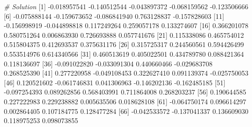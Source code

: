 \documentclass[
]{article}
\newenvironment{Shaded}{\begin{snugshade}}{\end{snugshade}}
\newcommand{\CommentTok}[1]{\textcolor[rgb]{0.56,0.35,0.01}{\textit{#1}}}
\newcommand{\DecValTok}[1]{\textcolor[rgb]{0.00,0.00,0.81}{#1}}
\newcommand{\FloatTok}[1]{\textcolor[rgb]{0.00,0.00,0.81}{#1}}
\newcommand{\NormalTok}[1]{#1}
\newcommand{\SpecialCharTok}[1]{\textcolor[rgb]{0.00,0.00,0.00}{#1}}
\begin{document}
\begin{Shaded}
\begin{Highlighting}[]
\CommentTok{\# Solution}
\NormalTok{  [}\DecValTok{1}\NormalTok{] }\SpecialCharTok{{-}}\FloatTok{0.018957541} \SpecialCharTok{{-}}\FloatTok{0.140512544} \SpecialCharTok{{-}}\FloatTok{0.043897372} \SpecialCharTok{{-}}\FloatTok{0.068159562} \SpecialCharTok{{-}}\FloatTok{0.123506666}
\NormalTok{  [}\DecValTok{6}\NormalTok{] }\SpecialCharTok{{-}}\FloatTok{0.075888144} \SpecialCharTok{{-}}\FloatTok{0.159673652} \SpecialCharTok{{-}}\FloatTok{0.086841940}  \FloatTok{0.763128837} \SpecialCharTok{{-}}\FloatTok{0.157828603}
\NormalTok{ [}\DecValTok{11}\NormalTok{] }\SpecialCharTok{{-}}\FloatTok{0.156998919} \SpecialCharTok{{-}}\FloatTok{0.044898818}  \FloatTok{0.117249264}  \FloatTok{0.259057178}  \FloatTok{0.133274607}
\NormalTok{ [}\DecValTok{16}\NormalTok{]  }\FloatTok{0.366201078}  \FloatTok{0.580751264}  \FloatTok{0.006863930}  \FloatTok{0.726693888}  \FloatTok{0.057741676}
\NormalTok{ [}\DecValTok{21}\NormalTok{]  }\FloatTok{0.115338086}  \FloatTok{0.465754012}  \FloatTok{0.515804375}  \FloatTok{0.412693537}  \FloatTok{0.375631176}
\NormalTok{ [}\DecValTok{26}\NormalTok{]  }\FloatTok{0.315725317}  \FloatTok{0.244560561}  \FloatTok{0.594426499}  \FloatTok{0.553514976}  \FloatTok{0.614340566}
\NormalTok{ [}\DecValTok{31}\NormalTok{]  }\FloatTok{0.460513619}  \FloatTok{0.405022501}  \FloatTok{0.434789780}  \FloatTok{0.088421364}  \FloatTok{0.118136697}
\NormalTok{ [}\DecValTok{36}\NormalTok{] }\SpecialCharTok{{-}}\FloatTok{0.091022820} \SpecialCharTok{{-}}\FloatTok{0.033091304}  \FloatTok{0.440660466} \SpecialCharTok{{-}}\FloatTok{0.029683708}  \FloatTok{0.268525390}
\NormalTok{ [}\DecValTok{41}\NormalTok{]  }\FloatTok{0.277220958} \SpecialCharTok{{-}}\FloatTok{0.049108453}  \FloatTok{0.322627410}  \FloatTok{0.091139374} \SpecialCharTok{{-}}\FloatTok{0.025750053}
\NormalTok{ [}\DecValTok{46}\NormalTok{]  }\FloatTok{0.120521602} \SpecialCharTok{{-}}\FloatTok{0.061746831}  \FloatTok{0.041306963} \SpecialCharTok{{-}}\FloatTok{0.146202136} \SpecialCharTok{{-}}\FloatTok{0.162485185}
\NormalTok{ [}\DecValTok{51}\NormalTok{] }\SpecialCharTok{{-}}\FloatTok{0.097254393}  \FloatTok{0.089262856}  \FloatTok{0.568403991}  \FloatTok{0.711864008}  \FloatTok{0.268203237}
\NormalTok{ [}\DecValTok{56}\NormalTok{]  }\FloatTok{0.190644585}  \FloatTok{0.227222983}  \FloatTok{0.229238882}  \FloatTok{0.005635506}  \FloatTok{0.018628108}
\NormalTok{ [}\DecValTok{61}\NormalTok{] }\SpecialCharTok{{-}}\FloatTok{0.064750174}  \FloatTok{0.096614297}  \FloatTok{0.002864405}  \FloatTok{0.107184775}  \FloatTok{0.128477284}
\NormalTok{ [}\DecValTok{66}\NormalTok{] }\SpecialCharTok{{-}}\FloatTok{0.042533572} \SpecialCharTok{{-}}\FloatTok{0.137041337}  \FloatTok{0.136609030}  \FloatTok{0.118975253}  \FloatTok{0.098073855}

\end{Highlighting}
\end{Shaded}
\end{document}

